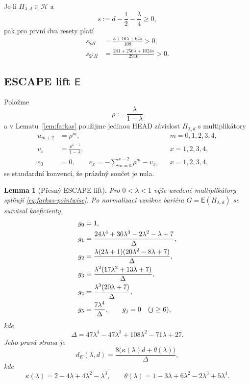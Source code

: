 \documentclass[11pt,a4paper]{article}
\newtheorem{lemma}[theorem]{Lemma}
\theoremstyle{remark}
\newcommand{\HH}{\mathcal H}
\newcommand{\Eop}{\mathsf E}
\newcommand{\Sop}{\mathsf S}
\begin{document}
Je-li $H_{\lambda,d}\in\HH$ a
\[
s:=d-\frac12-\frac\lambda4\ge0,
\]
pak pro první dva resety platí
\begin{align}
 s_{\Sop H}
 &=\frac{3+16\lambda+64s}{108}>0,\label{eq:Sslack1}\\
 s_{\Sop^2 H}
 &=\frac{241+256\lambda+1024s}{2916}>0.\label{eq:Sslack2}
\end{align}

\subsection{ESCAPE lift $\Eop$}

Položme
\[
\rho:=\frac\lambda{1-\lambda}
\]
a v Lematu~\ref{lem:farkas} použijme jedinou HEAD závislost
$H_{\lambda,d}$ s multiplikátory
\begin{align*}
u_{m+2}&=\rho^m, &&m=0,1,2,3,4,\\
v_x&=\frac{\rho^{x-1}}{1-\lambda}, &&x=1,2,3,4,\\
e_0&=0,
\qquad
e_x=-\sum_{m=0}^{x-2}\rho^m-v_x, &&x=1,2,3,4,
\end{align*}
se standardní konvencí, že prázdný součet je nula.

\begin{lemma}[Přesný ESCAPE lift]\label{lem:E}
Pro $0<\lambda<1$ výše uvedené multiplikátory splňují
\eqref{eq:farkas-pointwise}. Po normalizaci vznikne bariéra
$G=\Eop(H_{\lambda,d})$ se survival koeficienty
\begin{align}
g_0&=1,\notag\\
g_1&=\frac{24\lambda^4+36\lambda^3-2\lambda^2-\lambda+7}{\Delta},\notag\\
g_2&=\frac{\lambda(2\lambda+1)(20\lambda^2-8\lambda+7)}{\Delta},\notag\\
g_3&=\frac{\lambda^2(17\lambda^2+13\lambda+7)}{\Delta},\label{eq:Eshape}\\
g_4&=\frac{\lambda^3(20\lambda+7)}{\Delta},\notag\\
g_5&=\frac{7\lambda^4}{\Delta},
\qquad g_j=0\quad(j\ge6),\notag
\end{align}
kde
\begin{equation}\label{eq:Delta}
\Delta=47\lambda^4-47\lambda^3+108\lambda^2-71\lambda+27.
\end{equation}
Jeho pravá strana je
\begin{equation}\label{eq:dE}
\boxed{
 d_E(\lambda,d)
 =\frac{8\bigl(\kappa(\lambda)d+\theta(\lambda)\bigr)}{\Delta},}
\end{equation}
kde
\[
\kappa(\lambda)=2-4\lambda+4\lambda^2-\lambda^3,
\qquad
\theta(\lambda)=1-3\lambda+6\lambda^2-2\lambda^3+5\lambda^4.
\]
\end{lemma}
\end{document}
